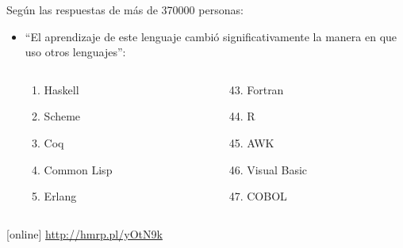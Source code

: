 \documentclass[spanish]{beamer}
\begin{document}
\begin{frame}
  Según las respuestas de más de 370000 personas:
  \begin{itemize}
  \item
    ``El aprendizaje de este lenguaje cambió significativamente la
    manera en que uso otros lenguajes'':
    \begin{columns}[T]
      \begin{column}{3cm}
        \begin{enumerate}
        \item Haskell
        \item Scheme
        \item Coq
        \item Common Lisp
        \item Erlang
        \end{enumerate}
      \end{column}
      \begin{column}{3cm}
        \begin{enumerate}
        \setcounter{enumi}{42}
        \item Fortran
        \item R
        \item AWK
        \item Visual Basic
        \item COBOL
        \end{enumerate}
      \end{column}
    \end{columns}
  \end{itemize}
  \begin{thebibliography}{}
  [online]
    \newblock \url{http://hmrp.pl/yOtN9k}
  \end{thebibliography}
\end{frame}

\end{document}
